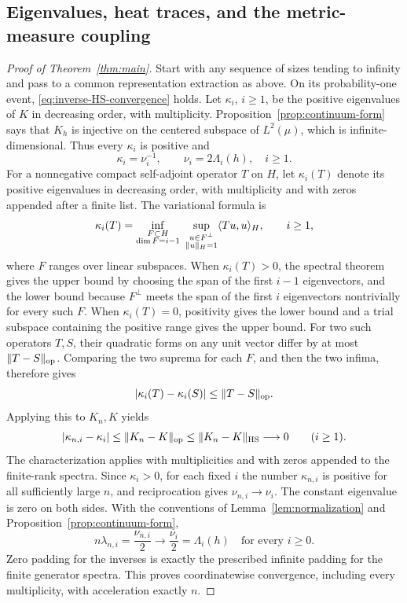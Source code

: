 \subsection{Eigenvalues, heat traces, and the metric-measure coupling}

\begin{proof}[Proof of Theorem~\ref{thm:main}]
Start with any sequence of sizes tending to infinity and pass to a common
representation extraction as above.  On its probability-one event,
\eqref{eq:inverse-HS-convergence} holds.  Let \(\kappa_i\), \(i\ge1\), be
the positive eigenvalues of \(K\) in decreasing order, with multiplicity.
Proposition~\ref{prop:continuum-form} says that \(K_h\) is injective on
the centered subspace of \(L^2(\mu)\), which is infinite-dimensional.
Thus every \(\kappa_i\) is positive and
\[
 \kappa_i=\nu_i^{-1},\qquad \nu_i=2\Lambda_i(h),\quad i\ge1.
\]
For a nonnegative compact self-adjoint operator \(T\) on \(H\), let
\(\kappa_i(T)\) denote its positive eigenvalues in decreasing order, with
multiplicity and with zeros appended after a finite list.  The variational
formula is
\[
 \kappa_i(T)=
 \inf_{\substack{F\subset H\\ \dim F=i-1}}
 \ \sup_{\substack{u\in F^\perp\\ \lVert u\rVert_H=1}}
       \langle Tu,u\rangle_H,\qquad i\ge1,
\]
where \(F\) ranges over linear subspaces.  When \(\kappa_i(T)>0\), the
spectral theorem gives the upper bound by choosing the span of the first
\(i-1\) eigenvectors, and the lower bound because \(F^\perp\) meets the
span of the first \(i\) eigenvectors nontrivially for every such \(F\).
When \(\kappa_i(T)=0\), positivity gives the lower bound and a trial
subspace containing the positive range gives the upper bound.  For two
such operators \(T,S\), their quadratic forms on any unit vector differ
by at most \(\lVert T-S\rVert_{\mathrm{op}}\).  Comparing the two suprema for
each \(F\), and then the two infima, therefore gives
\[
 \lvert \kappa_i(T)-\kappa_i(S)\rvert\le\lVert T-S\rVert_{\mathrm{op}}.
\]
Applying this to \(K_n,K\) yields
\[
 \lvert \kappa_{n,i}-\kappa_i\rvert
 \le\lVert K_n-K\rVert_{\mathrm{op}}
 \le\lVert K_n-K\rVert_{\mathrm{HS}}\longrightarrow0
 \qquad(i\ge1).
\]
The characterization applies with multiplicities and with zeros appended
to the finite-rank spectra.  Since \(\kappa_i>0\), for each fixed \(i\)
the number \(\kappa_{n,i}\) is positive for all sufficiently large \(n\),
and reciprocation gives \(\nu_{n,i}\to\nu_i\).  The constant eigenvalue is
zero on both sides.  With the conventions of
Lemma~\ref{lem:normalization} and Proposition~\ref{prop:continuum-form},
\begin{equation}\label{eq:target-eigenvalue-convergence}
 n\lambda_{n,i}=\frac{\nu_{n,i}}2
 \longrightarrow\frac{\nu_i}2=\Lambda_i(h)
 \quad\text{for every }i\ge0.
\end{equation}
Zero padding for the inverses is exactly the prescribed infinite padding
for the finite generator spectra.  This proves coordinatewise convergence,
including every multiplicity, with acceleration exactly \(n\).


\end{proof}
